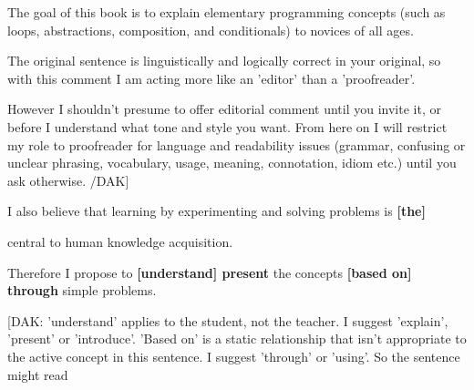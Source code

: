 \documentclass[12pt,a4paper]{article}
\begin{document}
\begin{flushleft}

\end{flushleft}


\begin{flushleft}
The goal of this book is to explain elementary programming concepts (such as loops, abstractions, composition, and conditionals) to novices of all ages. 
\end{flushleft}


\begin{flushleft}

\end{flushleft}


\begin{flushleft}
{The original sentence is linguistically and logically correct in your original, so with this comment I am acting more like an 'editor' than a 'proofreader'.  }
\end{flushleft}


\begin{flushleft}
{However I shouldn't presume to offer editorial comment until you invite it, or before I understand what tone and style you want.  From here on I will restrict my role to proofreader for language and readability issues (grammar, confusing or unclear phrasing, vocabulary, usage, meaning, connotation, idiom etc.) until you ask otherwise. /DAK]}
\end{flushleft}


\begin{flushleft}

\end{flushleft}


I also believe that learning by experimenting and solving problems is \textbf{[}\textbf{the}\textbf{]}


central to human knowledge acquisition. 





Therefore I propose to \textbf{[understand] present }the concepts \textbf{[based on] through} simple problems. 





[DAK: 'understand' applies to the student, not the teacher.  I suggest 'explain', 'present' or 'introduce'.  'Based on' is a static relationship that isn't appropriate to the active concept in this sentence.  I suggest 'through' or 'using'.  So the sentence might read
\end{document}
